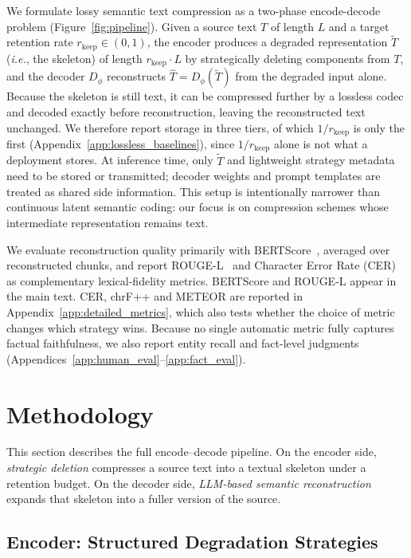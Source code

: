 \documentclass[11pt]{article}
\newcommand{\rkeep}{r_{\mathrm{keep}}}
\begin{document}
We formulate lossy semantic text compression as a two-phase encode-decode problem (Figure~\ref{fig:pipeline}). Given a source text $T$ of length $L$ and a target retention rate $\rkeep \in (0,1)$, the encoder produces a degraded representation $\tilde{T}$ ({\em i.e.}, the skeleton) of length $\rkeep \cdot L$ by strategically deleting components from $T$, and the decoder $D_\phi$ reconstructs $\hat{T} = D_\phi(\tilde{T})$ from the degraded input alone. Because the
skeleton is still text, it can be compressed further by a lossless codec and decoded exactly before
reconstruction, leaving the reconstructed text unchanged. We therefore report storage in three tiers, of which $1/\rkeep$ is only the first
(Appendix~\ref{app:lossless_baselines}), since $1/\rkeep$ alone is not what a deployment stores. At inference time, only $\tilde{T}$ and lightweight strategy metadata need to be stored or transmitted; decoder weights and prompt templates are treated as shared side information. This setup is intentionally narrower than continuous latent semantic coding: our focus is on compression schemes whose intermediate representation remains text.

We evaluate reconstruction quality primarily with BERTScore~\citep{zhang2020bertscore}, averaged over reconstructed chunks, and report ROUGE-L~\citep{lin2004rouge} and Character Error Rate (CER) as complementary lexical-fidelity metrics. BERTScore and ROUGE-L appear in the main text. CER, chrF++ and METEOR are reported in Appendix~\ref{app:detailed_metrics}, which also tests whether the choice of metric changes which strategy wins. Because no single automatic metric fully captures factual faithfulness, we also report entity recall and fact-level judgments (Appendices~\ref{app:human_eval}--\ref{app:fact_eval}).

\section{Methodology}
\label{sec:method}

This section describes the full encode--decode pipeline. On the encoder side, \emph{strategic deletion} compresses a source text into a textual skeleton under a retention budget. On the decoder side, \emph{LLM-based semantic reconstruction} expands that skeleton into a fuller version of the source.

\subsection*{Encoder: Structured Degradation Strategies}
\end{document}
